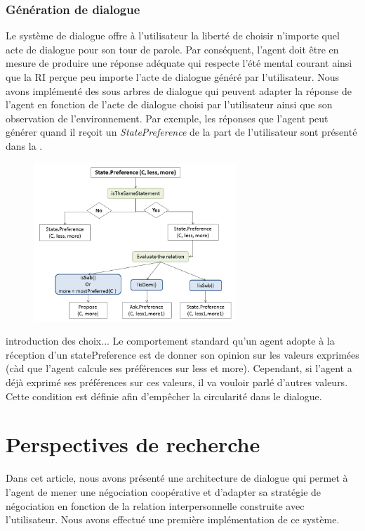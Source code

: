 \documentclass [french]{sig-alternate-05-2015}
\begin{document}
\subsubsection{Génération de dialogue} 
 \par Le système de dialogue offre à l'utilisateur la liberté de choisir n'importe quel acte de dialogue pour son tour de parole. Par conséquent, l'agent doit être en mesure de produire une réponse adéquate qui respecte l'été mental courant ainsi que la RI perçue peu importe l'acte de dialogue généré par l'utilisateur. Nous avons implémenté des sous arbres de dialogue qui peuvent adapter la réponse de l'agent en fonction de  l'acte de dialogue choisi par l'utilisateur ainsi que son observation de l'environnement. Par exemple, les réponses que l'agent peut générer quand il reçoit un \emph{StatePreference} de la part de l'utilisateur sont présenté dans la .
 \begin{figure} [h]
 	\centerline{\includegraphics[width=3in]{figs/statePref_v2.png}}
	\vskip 8pt
 \end{figure}
\par {\color{red} introduction des choix...} 
Le comportement standard qu'un agent adopte à la réception d'un statePreference est de donner son opinion sur les valeurs exprimées (càd que l'agent calcule ses préférences sur less et more). Cependant, si l'agent a déjà exprimé ses préférences sur ces valeurs, il va vouloir parlé d'autres valeurs. Cette condition est définie afin d’empêcher la circularité dans le dialogue.  
\section{Perspectives de recherche}
\label{conc}
Dans cet article, nous avons présenté une architecture de dialogue qui permet à l'agent de mener une négociation coopérative et d'adapter sa stratégie de négociation en fonction de la relation interpersonnelle construite avec l'utilisateur. Nous avons effectué une première implémentation de ce système. 
\end{document}
